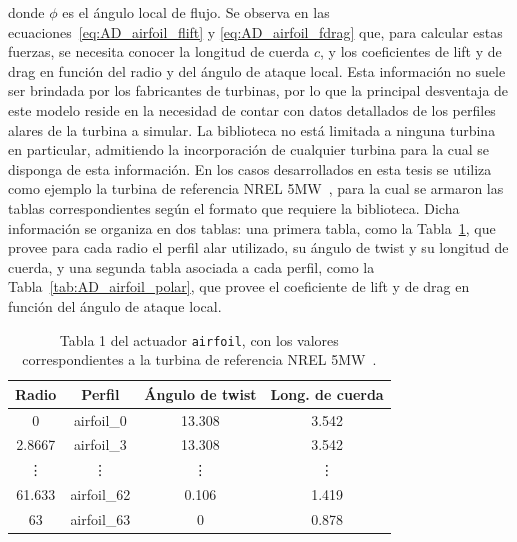 donde $\phi$ es el ángulo local de flujo. Se observa en las ecuaciones~\ref{eq:AD_airfoil_flift} y \ref{eq:AD_airfoil_fdrag} que, para calcular estas fuerzas, se necesita conocer la longitud de cuerda $c$, y los coeficientes de lift y de drag en función del radio y del ángulo de ataque local. Esta información no suele ser brindada por los fabricantes de turbinas, por lo que la principal desventaja de este modelo reside en la necesidad de contar con datos detallados de los perfiles alares de la turbina a simular.
La biblioteca no está limitada a ninguna turbina en particular, admitiendo la incorporación de cualquier turbina para la cual se disponga de esta información. En los casos desarrollados en esta tesis se utiliza como ejemplo la turbina de referencia NREL 5MW~\citep{jonkman2009}, para la cual se armaron las tablas correspondientes según el formato que requiere la biblioteca. Dicha información se organiza en dos tablas: una primera tabla, como la Tabla~\ref{tab:AD_airfoil_perfil}, que provee para cada radio el perfil alar utilizado, su ángulo de twist y su longitud de cuerda, y una segunda tabla asociada a cada perfil, como la Tabla~\ref{tab:AD_airfoil_polar}, que provee el coeficiente de lift y de drag en función del ángulo de ataque local.
\begin{table}[h]
\centering
\begin{tabular}{cccc}
\hline
Radio & Perfil & Ángulo de twist & Long. de cuerda \\
\hline
0 & airfoil\_0 & 13.308 & 3.542 \\
2.8667 & airfoil\_3 & 13.308 & 3.542 \\
\vdots & \vdots & \vdots & \vdots \\
61.633 & airfoil\_62 & 0.106 & 1.419 \\
63 & airfoil\_63 & 0 & 0.878 \\
\hline
\end{tabular}
\caption{Tabla 1 del actuador \texttt{airfoil}, con los valores correspondientes a la turbina de referencia NREL 5MW~\citep{jonkman2009}.}
\label{tab:AD_airfoil_perfil}
\end{table}

